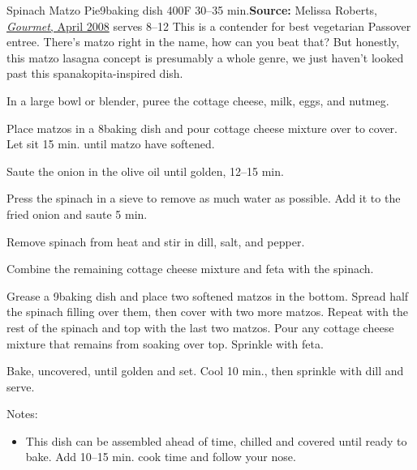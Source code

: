 \begin{recipe}{Spinach Matzo Pie}{9\inch{}\inch baking dish \hfill 400\0F \hfill 30--35 min.}{\textbf{Source:} Melissa Roberts, \href{https://www.epicurious.com/recipes/food/views/spinach-and-matzoh-pie-242019}{\textit{Gourmet}, April 2008} \hfill serves 8--12}
 \freeform This is a contender for best vegetarian Passover entree. There's matzo right in the name, how can you beat that? But honestly, this matzo lasagna concept is presumably a whole genre, we just haven't looked past this spanakopita-inspired dish.

 In a large bowl or blender, puree the cottage cheese, milk, eggs, and nutmeg.

 Place matzos in a 8\inch{}\inch baking dish and pour cottage cheese mixture over to cover. Let sit 15 min. until matzo have softened.

 Saute the onion in the olive oil until golden, 12--15 min.

 Press the spinach in a sieve to remove as much water as possible. Add it to the fried onion and saute 5 min.

 Remove spinach from heat and stir in dill, salt, and pepper.

 Combine the remaining cottage cheese mixture and feta with the spinach.

 Grease a 9\inch{}\inch baking dish and place two softened matzos in the bottom. Spread half the spinach filling over them, then cover with two more matzos. Repeat with the rest of the spinach and top with the last two matzos. Pour any cottage cheese mixture that remains from soaking over top. Sprinkle with feta.

 Bake, uncovered, until golden and set. Cool 10 min., then sprinkle with dill and serve.

 \freeform Notes:
 \begin{itemize}
  \item This dish can be assembled ahead of time, chilled and covered until ready to bake. Add 10--15 min. cook time and follow your nose.
 \end{itemize}
\end{recipe}
